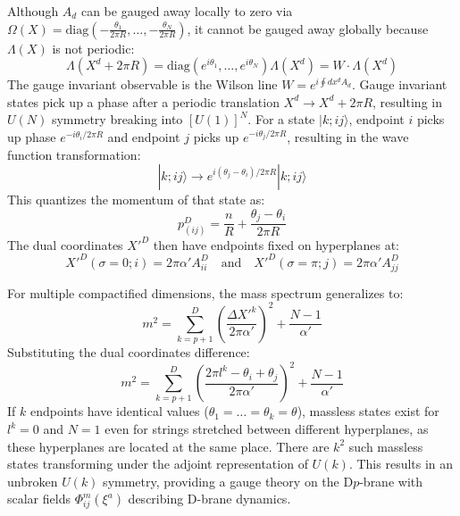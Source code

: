 \begin{tcolorbox}[breakable]
\begin{equation}
				\end{equation}
				Although $A_d$ can be gauged away locally to zero via $\Omega(X) = \text{diag}(-\frac{\theta_1}{2\pi R}, \dots, -\frac{\theta_N}{2\pi R})$, it cannot be gauged away globally because $\Lambda(X)$ is not periodic:
				\begin{equation}
					\Lambda(X^d + 2\pi R) = \text{diag}(e^{i\theta_1}, \dots, e^{i\theta_N}) \Lambda(X^d) = W \cdot \Lambda(X^d) 
				\end{equation}
				The gauge invariant observable is the Wilson line $W = e^{i \oint dx^d A_d}$. Gauge invariant states pick up a phase after a periodic translation $X^d \to X^d + 2\pi R$, resulting in $U(N)$ symmetry breaking into $[U(1)]^N$. For a state $|k; ij\rangle$, endpoint $i$ picks up phase $e^{-i\theta_i / 2\pi R}$ and endpoint $j$ picks up $e^{-i\theta_j / 2\pi R}$, resulting in the wave function transformation:
				\begin{equation}
					|k; ij\rangle \to e^{i(\theta_j - \theta_i) / 2\pi R} |k; ij\rangle 
				\end{equation}
				This quantizes the momentum of that state as:
				\begin{equation}
					p_{(ij)}^D = \frac{n}{R} + \frac{\theta_j - \theta_i}{2\pi R} 
				\end{equation}
				The dual coordinates $X'^D$ then have endpoints fixed on hyperplanes at:
				\begin{equation}
					X'^D(\sigma=0; i) = 2\pi \alpha' A_{ii}^D \quad \text{and} \quad X'^D(\sigma=\pi; j) = 2\pi \alpha' A_{jj}^D 
				\end{equation}
				
				For multiple compactified dimensions, the mass spectrum generalizes to:
				\begin{equation}
					m^2 = \sum_{k=p+1}^D \left( \frac{\Delta X'^k}{2\pi \alpha'} \right)^2 + \frac{N - 1}{\alpha'} 
				\end{equation}
				Substituting the dual coordinates difference:
				\begin{equation}
					m^2 = \sum_{k=p+1}^D \left( \frac{2\pi l^k - \theta_i + \theta_j}{2\pi \alpha'} \right)^2 + \frac{N - 1}{\alpha'} 
				\end{equation}
				If $k$ endpoints have identical values ($\theta_1 = \dots = \theta_k = \theta$), massless states exist for $l^k = 0$ and $N=1$ even for strings stretched between different hyperplanes, as these hyperplanes are located at the same place. There are $k^2$ such massless states transforming under the adjoint representation of $U(k)$. This results in an unbroken $U(k)$ symmetry, providing a gauge theory on the D$p$-brane with scalar fields $\Phi_{ij}^m(\xi^a)$ describing D-brane dynamics.
			

\end{tcolorbox}

